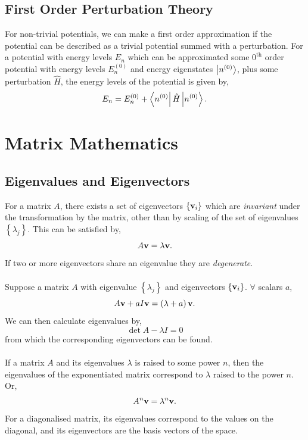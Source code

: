 \documentclass{book}
\begin{document}
\section{First Order Perturbation Theory}
For non-trivial potentials, we can make a first order approximation if the potential can be described as a trivial potential summed with a perturbation. For a potential with energy levels $E_n$ which can be approximated some $0^{\text{th}}$ order potential with energy levels $E^{(0)}_n$ and energy eigenstates $\ket{n^{(0)}}$, plus some perturbation $\hat{H}$, the energy levels of the potential is given by,
\begin{equation}
	E_n = E^{(0)}_n + \bra{n^{(0)}}\hat{H}\ket{n^{(0)}}.
\end{equation}

\appendix
\chapter {Matrix Mathematics}
\section{Eigenvalues and Eigenvectors}
For a matrix $A$, there exists a set of eigenvectors $\left\{\vb{v}_i\right\}$ which are \textit{invariant} under the transformation by the matrix, other than by scaling of the set of eigenvalues $\left\{\lambda_j\right\}$. This can be satisfied by,
\begin{equation}
	A\vb{v} = \lambda \vb{v}.
\end{equation}
If two or more eigenvectors share an eigenvalue they are \textit{degenerate}.
\\\\
Suppose a matrix $A$ with eigenvalue $\left\{\lambda_j\right\}$ and eigenvectors $\left\{\vb{v}_i\right\}$. $\forall$ scalars $a$,
\begin{equation}
	A\vb{v} + aI\vb{v} = \left(\lambda + a\right)\vb{v}.
\end{equation}
We can then calculate eigenvalues by,
\begin{equation}
	\det{A - \lambda I} = 0
\end{equation}
from which the corresponding eigenvectors can be found.
\\\\
If a matrix $A$ and its eigenvalues $\lambda$ is raised to some power $n$, then the eigenvalues of the exponentiated matrix correspond to $\lambda$ raised to the power $n$. Or,
\begin{equation}
	A^n\vb{v} = \lambda^n \vb{v}.
\end{equation}
For a diagonalised matrix, its eigenvalues correspond to the values on the diagonal, and its eigenvectors are the basis vectors of the space.
\end{document}
